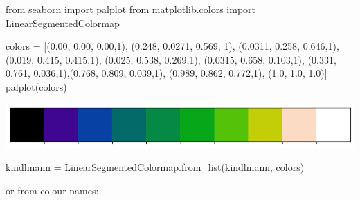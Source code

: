 \documentclass[
  letterpaper,
  DIV=11,
  numbers=noendperiod]{scrreprt}
\newenvironment{Shaded}{\begin{snugshade}}{\end{snugshade}}
\newcommand{\DecValTok}[1]{\textcolor[rgb]{0.68,0.00,0.00}{#1}}
\newcommand{\FloatTok}[1]{\textcolor[rgb]{0.68,0.00,0.00}{#1}}
\newcommand{\ImportTok}[1]{\textcolor[rgb]{0.00,0.46,0.62}{#1}}
\newcommand{\NormalTok}[1]{\textcolor[rgb]{0.00,0.23,0.31}{#1}}
\newcommand{\OperatorTok}[1]{\textcolor[rgb]{0.37,0.37,0.37}{#1}}
\newcommand{\StringTok}[1]{\textcolor[rgb]{0.13,0.47,0.30}{#1}}
\begin{document}
\begin{Shaded}
\begin{Highlighting}[]
\ImportTok{from}\NormalTok{ seaborn }\ImportTok{import}\NormalTok{ palplot}
\ImportTok{from}\NormalTok{ matplotlib.colors }\ImportTok{import}\NormalTok{ LinearSegmentedColormap}

\NormalTok{colors }\OperatorTok{=}\NormalTok{ [(}\FloatTok{0.00}\NormalTok{, }\FloatTok{0.00}\NormalTok{, }\FloatTok{0.00}\NormalTok{,}\DecValTok{1}\NormalTok{), (}\FloatTok{0.248}\NormalTok{, }\FloatTok{0.0271}\NormalTok{, }\FloatTok{0.569}\NormalTok{, }\DecValTok{1}\NormalTok{), (}\FloatTok{0.0311}\NormalTok{, }\FloatTok{0.258}\NormalTok{, }\FloatTok{0.646}\NormalTok{,}\DecValTok{1}\NormalTok{),}
\NormalTok{            (}\FloatTok{0.019}\NormalTok{, }\FloatTok{0.415}\NormalTok{, }\FloatTok{0.415}\NormalTok{,}\DecValTok{1}\NormalTok{), (}\FloatTok{0.025}\NormalTok{, }\FloatTok{0.538}\NormalTok{, }\FloatTok{0.269}\NormalTok{,}\DecValTok{1}\NormalTok{), (}\FloatTok{0.0315}\NormalTok{, }\FloatTok{0.658}\NormalTok{, }\FloatTok{0.103}\NormalTok{,}\DecValTok{1}\NormalTok{),}
\NormalTok{            (}\FloatTok{0.331}\NormalTok{, }\FloatTok{0.761}\NormalTok{, }\FloatTok{0.036}\NormalTok{,}\DecValTok{1}\NormalTok{),(}\FloatTok{0.768}\NormalTok{, }\FloatTok{0.809}\NormalTok{, }\FloatTok{0.039}\NormalTok{,}\DecValTok{1}\NormalTok{), (}\FloatTok{0.989}\NormalTok{, }\FloatTok{0.862}\NormalTok{, }\FloatTok{0.772}\NormalTok{,}\DecValTok{1}\NormalTok{),}
\NormalTok{            (}\FloatTok{1.0}\NormalTok{, }\FloatTok{1.0}\NormalTok{, }\FloatTok{1.0}\NormalTok{)]}
\NormalTok{palplot(colors)}
\end{Highlighting}
\end{Shaded}

\includegraphics{labs/w02_maps_files/figure-pdf/cell-29-output-1.png}

\begin{Shaded}
\begin{Highlighting}[]
\NormalTok{kindlmann }\OperatorTok{=}\NormalTok{ LinearSegmentedColormap.from\_list(}\StringTok{\textquotesingle{}kindlmann\textquotesingle{}}\NormalTok{, colors)}
\end{Highlighting}
\end{Shaded}

or from colour names:
\end{document}
